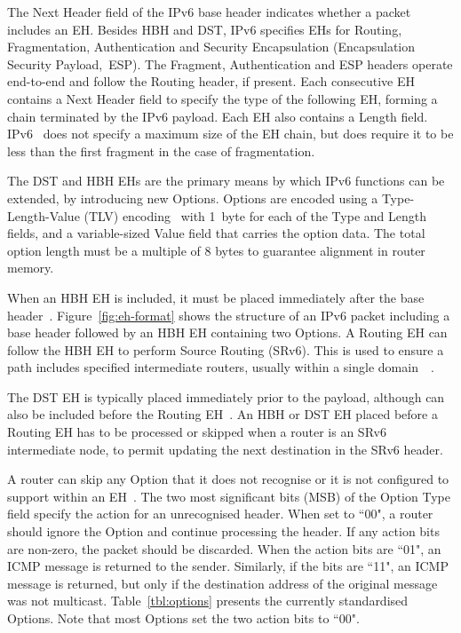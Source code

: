 \documentclass[conference]{IEEEtran}
\begin{document}
The Next Header field of the IPv6 base header indicates whether a packet
includes an EH.  Besides HBH and DST, IPv6 specifies EHs for Routing, Fragmentation,
Authentication and Security Encapsulation (Encapsulation Security Payload,~ESP).  The Fragment, Authentication and ESP headers operate end-to-end and follow the Routing
header, if present.  Each consecutive EH contains a Next Header field to
specify the type of the following EH, forming a chain terminated by the IPv6
payload. Each EH also contains a Length field.  IPv6~\cite{rfc8200} does not specify a maximum size of the EH chain, but does
require it to be less than the first fragment in the case of fragmentation. 

The DST and HBH EHs are the primary means by which IPv6 functions
can be extended, by introducing new Options. 
Options are encoded using a Type-Length-Value (TLV)
encoding~\cite{rfc8200} with 1~byte for each of the Type and Length fields, and
a variable-sized Value field that carries the option data. The total option
length must be a multiple of 8 bytes to guarantee alignment in router memory.

When an HBH EH is included, it must be placed immediately after the base
header~\cite{rfc8200}.  Figure~\ref{fig:eh-format} shows the structure of an
IPv6 packet including a base header followed by an HBH EH containing two
Options.  A Routing EH can follow the HBH EH to perform Source
Routing (SRv6). This is used to ensure a path includes specified intermediate
routers, usually within a single domain~\cite{srv6}~\cite{srperf}. 

The DST EH
is typically placed immediately prior to the payload, although can also be included before the Routing EH~\cite{rfc8200}. An HBH or
DST EH placed before a Routing EH has to be processed or skipped when a router is an
SRv6 intermediate node, to permit updating the next destination in the SRv6 header. 


A router can skip any Option that it does not recognise or it is not configured to
support within an EH~\cite{rfc8200}.  The two most significant bits (MSB) of the Option Type field specify
the action for an unrecognised header.  When set to ``00", a router should
ignore the Option and continue processing the header.  If any action bits are
non-zero, the packet should be discarded.  When the action bits are ``01", an
ICMP message is returned to the sender. Similarly, if the bits are ``11",
an ICMP message is returned, but only if the destination address of the original message was not multicast.
Table~\ref{tbl:options} presents the currently standardised Options.  Note that
most Options set the two action bits to ``00".
\end{document}
